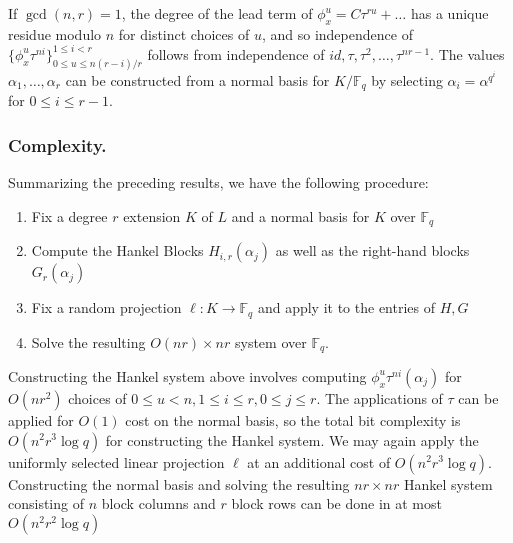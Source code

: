 \documentclass[sigconf]{acmart}
\newcommand{\F}{\mathbb{F}}
\begin{document}
If $\gcd(n,r) = 1$, the degree of the lead term of $\phi_x^u = C\tau^{ru} + \ldots$ has a unique residue modulo $n$ for distinct choices of $u$, and so independence of $\{ \phi_x^{u}\tau^{ni} \}_{0 \leq u \leq n(r-i)/r }^{1 \leq i < r}$ follows from independence of $id, \tau, \tau^2, \ldots, \tau^{nr-1}$. The values $\alpha_1, \ldots, \alpha_r$ can be constructed from a normal basis for $K/\F_q$ by selecting $\alpha_i = \alpha^{q^i}$ for $0 \leq i \leq r - 1$.

\subsubsection{Complexity.} Summarizing the preceding results, we have the following procedure:

\begin{enumerate}
    \item Fix a degree $r$ extension $K$ of $L$ and a normal basis for $K$ over $\F_q$
    \item Compute the Hankel Blocks $H_{i,r}(\alpha_j)$ as well as the right-hand blocks $G_r(\alpha_j)$
    \item Fix a random projection $\ell: K \to \F_q$ and apply it to the entries of $H, G$
    \item Solve the resulting $O(nr) \times nr$ system over $\F_q$.
\end{enumerate}
Constructing the Hankel system above involves computing $\phi_x^{u}\tau^{ni}(\alpha_j)$ for $O(nr^2)$ choices of $0 \leq u < n, 1 \leq i \leq r, 0 \leq j \leq r$. The applications of $\tau$ can be applied for $O(1)$ cost on the normal basis, so the total bit complexity is $O(n^2r^3\log q)$ for constructing the Hankel system. We may again apply the uniformly selected linear projection $\ell$ at an additional cost of $O(n^2r^3\log q)$. Constructing the normal basis and solving the resulting $nr \times nr$ Hankel system consisting of $n$ block columns and $r$ block rows can be done in at most $O(n^2r^2\log q)$













\end{document}
